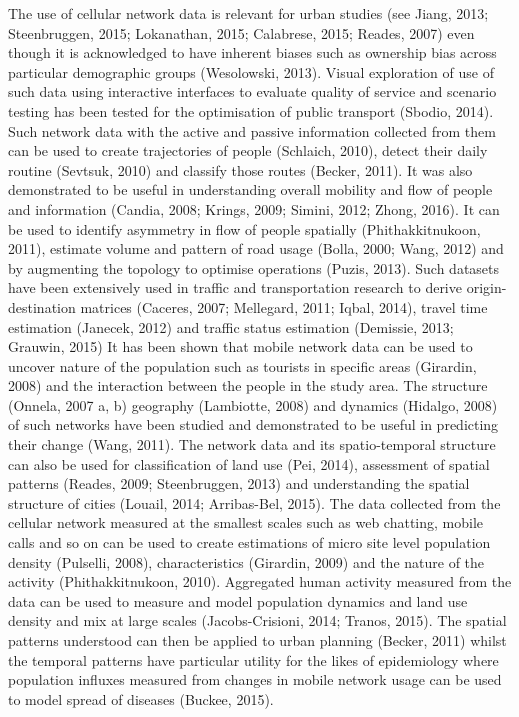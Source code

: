 The use of cellular network data is relevant for urban studies (see Jiang, 2013; Steenbruggen, 2015; Lokanathan, 2015; Calabrese, 2015; Reades, 2007) even though it is acknowledged to have inherent biases such as ownership bias across particular demographic groups (Wesolowski, 2013).
Visual exploration of use of such data using interactive interfaces to evaluate quality of service and scenario testing has been tested for the optimisation of public transport (Sbodio, 2014).
Such network data with the active and passive information collected from them can be used to create trajectories of people (Schlaich, 2010), detect their daily routine (Sevtsuk, 2010) and classify those routes (Becker, 2011).
It was also demonstrated to be useful in understanding overall mobility and flow of people and information (Candia, 2008; Krings, 2009; Simini, 2012; Zhong, 2016).
It can be used to identify asymmetry in flow of people spatially (Phithakkitnukoon, 2011), estimate volume and pattern of road usage (Bolla, 2000; Wang, 2012) and by augmenting the topology to optimise operations (Puzis, 2013).
Such datasets have been extensively used in traffic and transportation research to derive origin-destination matrices (Caceres, 2007; Mellegard, 2011; Iqbal, 2014), travel time estimation (Janecek, 2012) and traffic status estimation (Demissie, 2013; Grauwin, 2015)        
It has been shown that mobile network data can be used to uncover nature of the population such as tourists in specific areas (Girardin, 2008) and the interaction between the people in the study area.
The structure (Onnela, 2007 a, b) geography (Lambiotte, 2008) and dynamics (Hidalgo, 2008) of such networks have been studied and demonstrated to be useful in predicting their change (Wang, 2011).
The network data and its spatio-temporal structure can also be used for classification of land use (Pei, 2014), assessment of spatial patterns (Reades, 2009; Steenbruggen, 2013) and understanding the spatial structure of cities (Louail, 2014; Arribas-Bel, 2015).
The data collected from the cellular network measured at the smallest scales such as web chatting, mobile calls and so on can be used to create estimations of micro site level population density (Pulselli, 2008), characteristics (Girardin, 2009) and the nature of the activity (Phithakkitnukoon, 2010).
Aggregated human activity measured from the data can be used to measure and model population dynamics and land use density and mix at large scales (Jacobs-Crisioni, 2014; Tranos, 2015).
The spatial patterns understood can then be applied to urban planning (Becker, 2011) whilst the temporal patterns have particular utility for the likes of epidemiology where population influxes measured from changes in mobile network usage can be used to model spread of diseases (Buckee, 2015).

